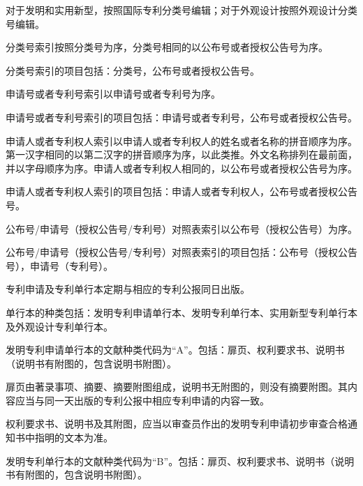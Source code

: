 对于发明和实用新型，按照国际专利分类号编辑；对于外观设计按照外观设计分类号编辑。

分类号索引按照分类号为序，分类号相同的以公布号或者授权公告号为序。

分类号索引的项目包括：分类号，公布号或者授权公告号。

申请号或者专利号索引以申请号或者专利号为序。

申请号或者专利号索引的项目包括：申请号或者专利号，公布号或者授权公告号。

{\setlength{\parindent}{22.2bp}申请人或者专利权人索引以申请人或者专利权人的姓名或者名称的拼音顺序为序。第一汉字相同的以第二汉字的拼音顺序为序，以此类推。外文名称排列在最前面，并以字母顺序为序。申请人或者专利权人相同的，以公布号或者授权公告号为序。\par}

申请人或者专利权人索引的项目包括：申请人或者专利权人，公布号或者授权公告号。

公布号/申请号（授权公告号/专利号）对照表索引以公布号（授权公告号）为序。

公布号/申请号（授权公告号/专利号）对照表索引的项目包括：公布号（授权公告号），申请号（专利号）。

专利申请及专利单行本定期与相应的专利公报同日出版。

单行本的种类包括：发明专利申请单行本、发明专利单行本、实用新型专利单行本及外观设计专利单行本。

发明专利申请单行本的文献种类代码为“A”。包括：扉页、权利要求书、说明书（说明书有附图的，包含说明书附图）。

扉页由著录事项、摘要、摘要附图组成，说明书无附图的，则没有摘要附图。其内容应当与同一天出版的专利公报中相应专利申请的内容一致。

权利要求书、说明书及其附图，应当以审查员作出的发明专利申请初步审查合格通知书中指明的文本为准。

发明专利单行本的文献种类代码为“B”。包括：扉页、权利要求书、说明书（说明书有附图的，包含说明书附图）。


